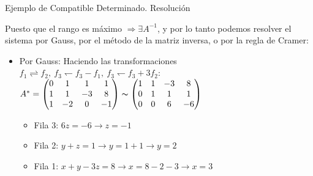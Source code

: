 \documentclass[11pt]{beamer}
\begin{document}
\begin{frame}{Ejemplo de Compatible Determinado. Resolución}

 Puesto que el rango es máximo $\Rightarrow \exists A^{-1}$, y por lo tanto podemos resolver el sistema por Gauss, por el método de la matriz inversa, o por la regla de Cramer:
\begin{itemize}[<+->]
    \item Por Gauss:
    Haciendo las transformaciones $f_1 \rightleftharpoons f_2 , \ f_3\leftharpoondown f_3-f_1, \  f_3\leftharpoondown f_3+3f_2$:\\
    $A^*=\left(\begin{matrix}0 & 1 & 1 & 1\\1 & 1 & -3 & 8\\1 & -2 & 0 & -1\end{matrix}\right)\thicksim
    \left(\begin{matrix}1 & 1 & -3 & 8\\0 & 1 & 1 & 1\\0 & 0 & 6 & -6\end{matrix}\right)$
    \begin{itemize}
        \item Fila 3: $6z = -6 \to z = -1$
        \item Fila 2: $y+z=1 \to y = 1+1 \to y=2$
        \item Fila 1: $x+y-3z=8 \to x=8-2-3 \to x=3$
    \end{itemize}
\end{itemize}
\end{frame}
\end{document}
